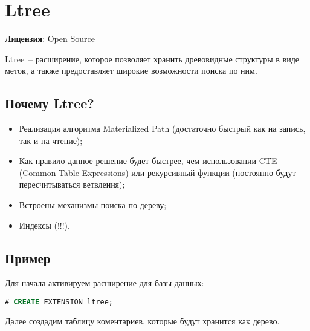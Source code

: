 \section{Ltree}
\textbf{Лицензия}: Open Source

Ltree~-- расширение, которое позволяет хранить древовидные структуры в виде меток, а также предоставляет широкие возможности поиска по ним.

\subsection{Почему Ltree?}

\begin{itemize}
  \item Реализация алгоритма Materialized Path (достаточно быстрый как на запись, так и на чтение);
  \item Как правило данное решение будет быстрее, чем использовании CTE (Common Table Expressions) или рекурсивный функции (постоянно будут пересчитываться ветвления);
  \item Встроены механизмы поиска по дереву;
  \item Индексы (!!!).
\end{itemize}

\subsection{Пример}

Для начала активируем расширение для базы данных:

\begin{lstlisting}[language=SQL,label=lst:pgltree1,caption=Ltree]
# CREATE EXTENSION ltree;
\end{lstlisting}

Далее создадим таблицу коментариев, которые будут хранится как дерево.

